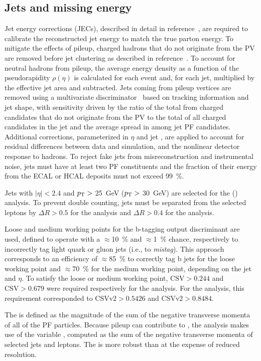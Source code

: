 \subsection{Jets and missing energy}
\label{sec:jet-clustering}
Jet energy corrections (JECs), described in detail in
reference~\cite{1748-0221-12-02-P02014}, are required to calibrate the
reconstructed jet energy to match the true parton energy. To mitigate the
effects of pileup, charged hadrons that do not originate from the PV are removed
before jet clustering as described in reference~\cite{CMS-PAS-JME-14-001}. To
account for neutral hadrons from pileup, the average energy density as a
function of the pseudorapidity $\rho(\eta)$ is calculated for each event and,
for each jet, multiplied by the effective jet area and subtracted. Jets coming
from pileup vertices are removed using a multivariate
discriminator~\cite{CMS-PAS-JME-13-005} based on tracking information and jet
shape, with sensitivity driven by the ratio of the total \pT from charged
candidates that do not originate from the PV to the total \pT of all charged
candidates in the jet and the average spread in \pT among jet PF candidates.
Additional corrections, parameterized in $\eta$ and jet \pT, are applied to
account for residual differences between data and simulation, and the nonlinear
detector response to hadrons. To reject fake jets from misreconstruction and
instrumental noise, jets must have at least two PF constituents and the fraction
of their energy from the ECAL or HCAL deposits must not exceed
\SI{99}{\percent}.

Jets with $|\eta| < 2.4$ and $p_\text{T} >$ \SI{25}{~GeV} ($p_\text{T} >$ \SI{30}{~GeV}) are
selected for the \eightTeV (\thirteenTeV) analysis. To prevent double counting,
jets must be separated from the selected leptons by $\Delta R > 0.5$  for the
\eightTeV analysis and $\Delta R > 0.4$ for the \thirteenTeV analysis.

Loose and medium working points for the b-tagging output discriminant are used,
defined to operate with a $\approx$\SI{10}{\percent} and
$\approx$\SI{1}{\percent} chance, respectively to incorrectly tag light quark or
gluon jets (i.e., to \emph{mistag}). This approach corresponds to an efficiency
of $\approx$\SI{85}{\percent} to correctly tag b jets for the loose working
point and $\approx$\SI{70}{\percent} for the medium working point, depending on
the jet \pT and $\eta$. To satisfy the loose or medium working point,
$\text{CSV} > 0.244$ and $\text{CSV} > 0.679$ were required respectively for the
\eightTeV analysis. For the \thirteenTeV analysis, this requirement corresponded
to $\text{CSVv2} > 0.5426$ and $\text{CSVv2} > 0.8484$.

The \pTmiss is defined as the magnitude of the sum of the negative transverse
momenta of all of the PF particles. Because pileup can contribute to \pTmiss,
the \eightTeV analysis makes use of the variable \HTmiss, computed as the sum of
the negative transverse momenta of selected jets and leptons. The \HTmiss is
more robust than \pTmiss at the expense of reduced resolution.

